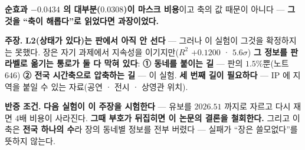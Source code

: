 \documentclass[10pt,a4paper]{article}
\newcommand{\claim}[2]{\begin{claimbox}\textbf{주장.} #1\par\smallskip
  \textcolor{gray!70}{\textbf{반증 조건.} #2}\end{claimbox}}
\begin{document}
\textbf{순효과 $-0.0434$ 의 대부분($0.0308$)이 마스크 비용}이고 축의 값 때문이 아니다
--- \textbf{그것을 ``축이 해롭다''로 읽었다면 과장이었다.}

\claim{\textbf{L2(상태가 있다)는 판에서 아직 안 선다} --- 그러나 이 실험이 그것을
확정하지는 못했다. 장은 자기 과제에서 지속성을 이기지만($R^2$ $+0.1200$ ·
$5.6\sigma$) \textbf{그 정보를 판 라벨로 옮기는 통로가 둘 다 막혀 있다}: \textbf{①
동네를 붙이는 길} --- 판의 $1.5\%$뿐(노트 $646$) \textbf{② 전국 시간축으로 압축하는
길} --- 이 실험. \textbf{세 번째 길이 필요하다} --- IP 에 지역을 붙일 수 있는
자료(공연 · 전시 · 상영관 위치).}
{\textbf{다음 실험이 이 주장을 시험한다} --- 유보를 $2026.51$ 까지로 자르고 다시
재면 $4$배 비용이 사라진다. \textbf{그때 부호가 뒤집히면 이 논문의 결론을
철회한다.} 그리고 이 축은 \textbf{전국 하나의 수}라 장의 동네별 정보를 전부 버렸다 ---
실패가 ``장은 쓸모없다''를 뜻하지 않는다.}
\end{document}
